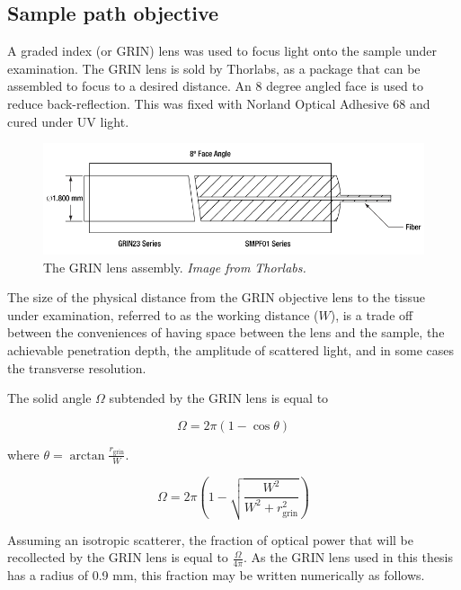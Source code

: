 \subsection{Sample path objective}

A graded index (or GRIN) lens was used to focus light onto the sample under examination. The GRIN lens is sold by Thorlabs, as a package that can be assembled to focus to a desired distance. An 8 degree angled face is used to reduce back-reflection. This was fixed with Norland Optical Adhesive 68 and cured under UV light.

\begin{figure}[h!]
\centering
\includegraphics[width=1.0\textwidth]{Images/System/grin_angled.png}
\caption[The GRIN lens assembly.]{The GRIN lens assembly. \em{Image from Thorlabs.} \label{fig:grin_assembly}}
\end{figure}

The size of the physical distance from the GRIN objective lens to the tissue under examination, referred to as the working distance ($W$), is a trade off between the conveniences of having space between the lens and the sample, the achievable penetration depth, the amplitude of scattered light, and in some cases the transverse resolution.


The solid angle $\Omega$ subtended by the GRIN lens is equal to

\begin{equation}
\Omega = 2 \pi (1 - \cos{\theta})
\end{equation}

where $\theta = \arctan{\frac{r_{\mathrm{grin}}}{W}}$.

\begin{equation}
\Omega = 2 \pi \left(1 - \sqrt{\frac{W^2}{W^2 + r_{\mathrm{grin}}^2}} \right)
\end{equation}

Assuming an isotropic scatterer, the fraction of optical power that will be recollected by the GRIN lens is equal to $\frac{\Omega}{4 \pi}$. As the GRIN lens used in this thesis has a radius of 0.9 mm, this fraction may be written numerically as follows.

